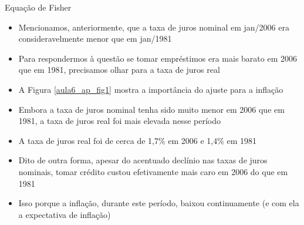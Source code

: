 \documentclass[10pt]{beamer}
\begin{document}
\begin{frame}{Equação de Fisher}
    \begin{itemize}
        \item Mencionamos, anteriormente, que a taxa de juros nominal em jan/2006 era consideravelmente menor que em jan/1981\bigskip
        \item Para respondermos à questão se tomar empréstimos era mais barato em 2006 que em 1981, precisamos olhar para a taxa de juros real\bigskip

        \item A Figura \ref{aula6_ap_fig1} mostra a importância do ajuste para a inflação\bigskip

        \item Embora a taxa de juros nominal tenha sido muito menor em 2006 que em 1981, a taxa de juros real foi mais elevada nesse período\bigskip

        \item A taxa de juros real foi de cerca de 1,7\% em 2006 e 1,4\% em 1981\bigskip

        \item Dito de outra forma, apesar do acentuado declínio nas taxas de juros nominais, tomar crédito custou efetivamente mais caro em 2006 do que em 1981\bigskip

        \item Isso porque a inflação, durante este período, baixou continuamente (e com ela a expectativa de inflação)
    \end{itemize}
\end{frame}
\end{document}
